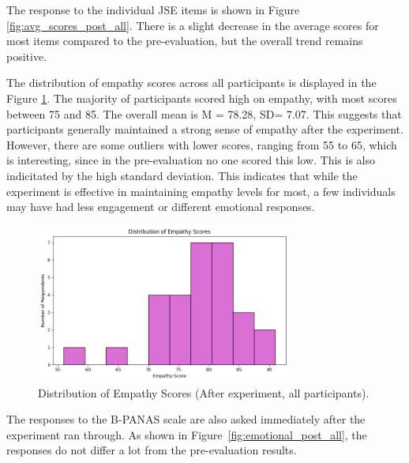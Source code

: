 The response to the individual JSE items is shown in Figure \ref{fig:avg_scores_post_all}. There is a slight decrease in the average scores for most items compared to the pre-evaluation, but the overall trend remains positive. 

\vspace{1em}

The distribution of empathy scores across all participants is displayed in the Figure \ref{fig:empathy_scores_post_all}. The majority of participants scored high on empathy, with most scores between 75 and 85. The overall mean is M = 78.28, SD= 7.07. This suggests that participants generally maintained a strong sense of empathy after the experiment. However, there are some outliers with lower scores, ranging from 55 to 65, which is interesting, since in the pre-evaluation no one scored this low. This is also indicitated by the high standard deviation. This indicates that while the experiment is effective in maintaining empathy levels for most, a few individuals may have had less engagement or different emotional responses.

\begin{figure}[H]
\centering
\includegraphics[width=0.75\textwidth]{../../Figures/empathy_scores_post_all.png}
\caption{Distribution of Empathy Scores (After experiment, all participants).}
\label{fig:empathy_scores_post_all}
\end{figure}

\vspace{1em}

The responses to the B-PANAS scale are also asked immediately after the experiment ran through. As shown in Figure~\ref{fig:emotional_post_all}, the responses do not differ a lot from the pre-evaluation results. 

